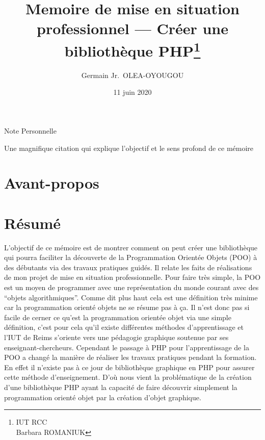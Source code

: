 \documentclass[11pt,a4paper,krantz2,11pt,oneside]{krantz}
\title{Memoire de mise en situation professionnel --- Créer une bibliothèque PHP\thanks{IUT RCC\\
Barbara ROMANIUK}}
\author{Germain Jr.~OLEA-OYOUGOU}
\date{11 juin 2020}
\begin{document}
\maketitle

\thispagestyle{empty}
\begin{center}
\Large{Note Personnelle}

\large{Une magnifique citation qui explique l'objectif et le sens profond de ce mémoire}
\end{center}

\setlength{\abovedisplayskip}{-5pt}
\setlength{\abovedisplayshortskip}{-5pt}

{
\hypersetup{linkcolor=}
\setcounter{tocdepth}{1}
\tableofcontents
}
\listoftables
\listoffigures
\hypertarget{avant-propos}{%
\chapter*{Avant-propos}\label{avant-propos}}


\mainmatter

\hypertarget{ruxe9sumuxe9}{%
\chapter*{Résumé}\label{ruxe9sumuxe9}}


L'objectif de ce mémoire est de montrer comment on peut créer une bibliothèque qui pourra faciliter la découverte de la Programmation Orientée Objets (POO) à des débutants via des travaux pratiques guidés. Il relate les faits de réalisations de mon projet de mise en situation professionnelle. Pour faire très simple, la POO est un moyen de programmer avec une représentation du monde courant avec des ``objets algorithmiques''. Comme dit plus haut cela est une définition très minime car la programmation orienté objets ne se résume pas à ça. Il n'est donc pas si facile de cerner ce qu'est la programmation orientée objet via une simple définition, c'est pour cela qu'il existe différentes méthodes d'apprentissage et l'IUT de Reims s'oriente vers une pédagogie graphique soutenue par ses enseignant-chercheurs. Cependant le passage à PHP pour l'apprentissage de la POO a changé la manière de réaliser les travaux pratiques pendant la formation. En effet il n'existe pas à ce jour de bibliothèque graphique en PHP pour assurer cette méthode d'enseignement. D'où nous vient la problématique de la création d'une bibliothèque PHP ayant la capacité de faire découvrir simplement la programmation orienté objet par la création d'objet graphique.
\end{document}
